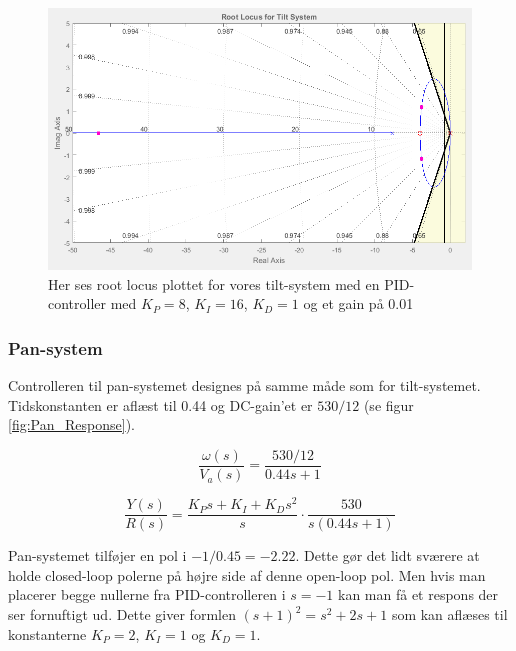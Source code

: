 \begin{figure}[ht]
	\begin{center}
		\includegraphics[scale=0.45]{Billeder/Tilt_Rlocus.PNG}
	\end{center}
\caption{Her ses root locus plottet for vores tilt-system med en PID-controller med $K_{P}=8$, $K_{I}=16$, $K_{D}=1$ og et gain på 0.01}
\label{fig:Tilt_rlocus}
\end{figure}

\subsubsection{Pan-system}

Controlleren til pan-systemet designes på samme måde som for tilt-systemet. Tidskonstanten er aflæst til 0.44 og DC-gain'et er $530/12$ (se figur \ref{fig:Pan_Response}). 

\begin{equation}\label{eq:pan_tf}
\frac{\omega(s)}{V_{a}(s)}=\frac{530/12}{0.44s+1}
\end{equation}

\begin{equation}\label{eq:pan_ol_tf}
\frac{Y(s)}{R(s)}=\frac{K_{P}s+K_{I}+K_{D}s^2}{s}\cdot\frac{530}{s(0.44s+1)}
\end{equation}

Pan-systemet tilføjer en pol i $-1/0.45=-2.22$. Dette gør det lidt sværere at holde closed-loop polerne på højre side af denne open-loop pol. Men hvis man placerer begge nullerne fra PID-controlleren i $s=-1$ kan man få et respons der ser fornuftigt ud. Dette giver formlen $(s+1)^2=s^2+2s+1$ som kan aflæses til konstanterne $K_{P}=2$, $K_{I}=1$ og $K_{D}=1$. 

